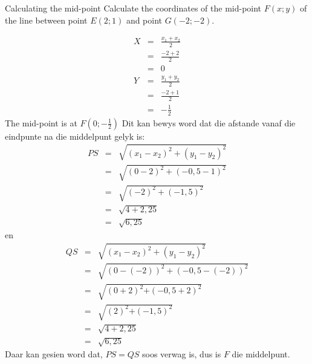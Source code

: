\begin{wex}{Calculating the mid-point}
 {Calculate the coordinates of the mid-point $F(x;y)$ of the line between point $E(2;1)$ and point $G(-2;-2)$.}
{
\setcounter{subfigure}{0}
\begin{figure}[H] %
\begin{center}
\end{center}
\end{figure} 
\begin{eqnarray*}
X & = & \frac{{x}_{1} + {x}_{2}}{2} \\ 
& = & \frac{-2 + 2}{2} \\ 
& = & 0 \\ 
Y & = & \frac{{y}_{1} + {y}_{2}}{2} \\ 
& = & \frac{-2 + 1}{2} \\ 
& = & -\frac{1}{2} 
\end{eqnarray*}
The mid-point is at $F(0;-\frac{1}{2})$
Dit kan bewys word dat die afstande vanaf die eindpunte na die middelpunt gelyk is: 
\begin{eqnarray*}
PS & = & \sqrt{{({x}_{1} - {x}_{2})}^{2} + {({y}_{1} - {y}_{2})}^{2}} \\ 
& = & \sqrt{{(0 - 2)}^{2} + {(-0,5 - 1)}^{2}} \\ 
& = & \sqrt{{(-2)}^{2} + {(-1,5)}^{2}} \\ 
& = & \sqrt{4 + 2,25} \\ 
& = & \sqrt{6,25}
\end{eqnarray*}
en
\begin{eqnarray*}
QS & = & \sqrt{{({x}_{1} - {x}_{2})}^{2} + {({y}_{1} - {y}_{2})}^{2}} \\ 
& = & \sqrt{{(0 - (-2))}^{2} + {(-0,5 - (-2))}^{2}} \\ 
& = & \sqrt{{(0 + 2)}^{2}{+(-0,5 + 2)}^{2}} \\ 
& = & \sqrt{{(2)}^{2}{+(-1,5)}^{2}} \\ 
& = & \sqrt{4 + 2,25} \\ 
& = & \sqrt{6,25}
\end{eqnarray*}
Daar kan gesien word dat, $PS=QS$ soos verwag is, dus is $F$ die middelpunt. 
}
\end{wex}
